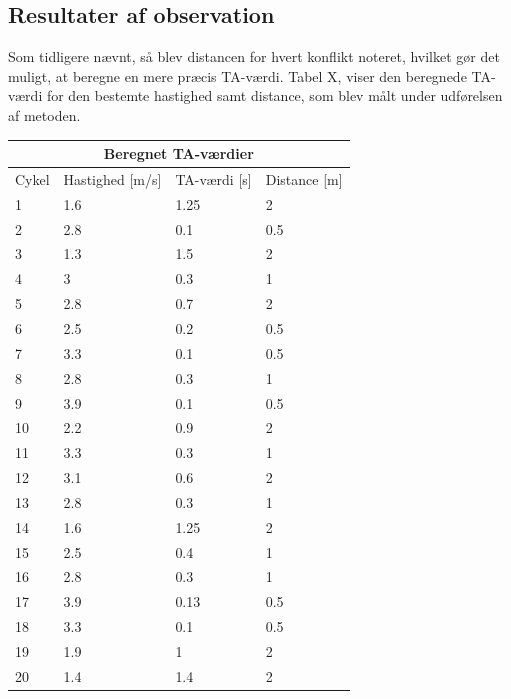\subsection{Resultater af observation}
\label{sub:def_konflikt}

Som tidligere nævnt, så blev distancen for hvert konflikt noteret, hvilket gør det muligt, at beregne en mere præcis TA-værdi. Tabel X, viser den beregnede TA-værdi for den bestemte hastighed samt distance, som blev målt under udførelsen af metoden.
\begin{tabular}{ |p{1cm}|p{4cm}|p{4cm}|p{4cm}|  }
\hline
\multicolumn{4}{|c|}{Beregnet TA-værdier} \\
\hline
Cykel & Hastighed [m/s] & TA-værdi [s] & Distance [m] \\
\hline
1 & 1.6   & 1.25 & 2 \\
2 & 2.8 & 0.1 & 0.5 \\
3 & 1.3 & 1.5 & 2 \\
4 & 3  & 0.3 & 1 \\
5 & 2.8  & 0.7 & 2 \\
6 & 2.5   & 0.2 & 0.5 \\
7 & 3.3  & 0.1 & 0.5 \\
8 & 2.8  & 0.3 & 1 \\
9 & 3.9  & 0.1 & 0.5 \\
10 & 2.2  & 0.9   & 2 \\
11 & 3.3 & 0.3 &  1 \\
12 & 3.1 & 0.6 &   2\\
13 & 2.8 & 0.3 & 1\\
14 & 1.6  & 1.25   & 2\\
15 & 2.5  & 0.4 & 1\\
16 & 2.8 & 0.3 & 1\\
17 & 3.9 & 0.13 &0.5\\
18 & 3.3 & 0.1 & 0.5\\
19 & 1.9  & 1 & 2\\
20 & 1.4  & 1.4 & 2\\
\hline
\end{tabular}


